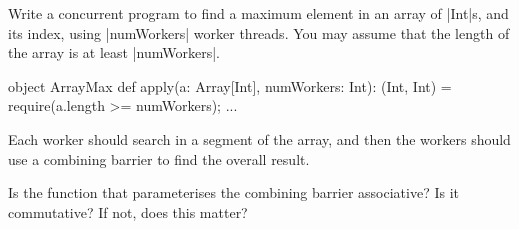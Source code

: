 \begin{questionS}
Write a concurrent program to find a maximum element in an array of |Int|s,
and its index, using |numWorkers| worker threads.  You may assume that the
length of the array is at least |numWorkers|.
%
\begin{scala}
object ArrayMax{
  def apply(a: Array[Int], numWorkers: Int): (Int, Int) = {
    require(a.length >= numWorkers); ... 
  }
}
\end{scala}
%
Each worker should search in a segment of the array, and then the workers
should use a combining barrier to find the overall result.  

Is the function that parameterises the combining barrier associative?  Is it
commutative?  If not, does this matter?
\end{questionS}


